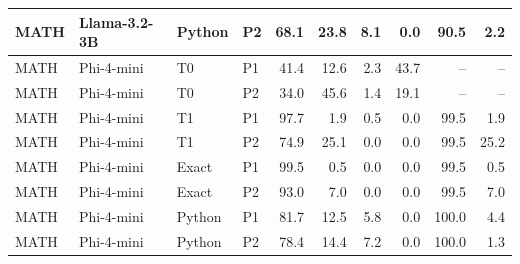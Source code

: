 \begin{tabular}{llll rrrr rr}
MATH & Llama-3.2-3B & Python & P2 & 68.1 & 23.8 & 8.1 & 0.0 & 90.5 & 2.2\\
\midrule
MATH & Phi-4-mini & T0 & P1 & 41.4 & 12.6 & 2.3 & 43.7 & -- & --\\
MATH & Phi-4-mini & T0 & P2 & 34.0 & 45.6 & 1.4 & 19.1 & -- & --\\
MATH & Phi-4-mini & T1 & P1 & 97.7 & 1.9 & 0.5 & 0.0 & 99.5 & 1.9\\
MATH & Phi-4-mini & T1 & P2 & 74.9 & 25.1 & 0.0 & 0.0 & 99.5 & 25.2\\
MATH & Phi-4-mini & Exact & P1 & 99.5 & 0.5 & 0.0 & 0.0 & 99.5 & 0.5\\
MATH & Phi-4-mini & Exact & P2 & 93.0 & 7.0 & 0.0 & 0.0 & 99.5 & 7.0\\
MATH & Phi-4-mini & Python & P1 & 81.7 & 12.5 & 5.8 & 0.0 & 100.0 & 4.4\\
MATH & Phi-4-mini & Python & P2 & 78.4 & 14.4 & 7.2 & 0.0 & 100.0 & 1.3\\
\bottomrule
\end{tabular}